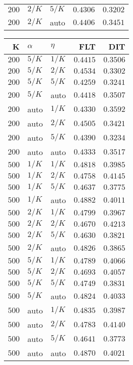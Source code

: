 \begin{table}
\begin{spacing}{1.2}
{\begin{tabular}{rll|rr}
$200$ &  $2/K$ &  $5/K$ &         $0.4306$ & $0.3202$ \\
$200$ &  $2/K$ &   auto &         $0.4406$ & $0.3451$ \\
\bottomrule
\end{tabular}
} \hfill \parbox{.45\linewidth}{\centering \begin{tabular}{rll|rr}
\toprule
    K &  $\alpha$ &    $\eta$ & FLT &        DIT \\
\midrule
$200$ &  $5/K$ &  $1/K$ &         $0.4415$ &      $0.3506$ \\
$200$ &  $5/K$ &  $2/K$ &         $0.4534$ &      $0.3302$ \\
$200$ &  $5/K$ &  $5/K$ &         $0.4259$ &      $0.3241$ \\
$200$ &  $5/K$ &   auto &         $0.4418$ &      $0.3507$ \\
$200$ &   auto &  $1/K$ &         $0.4330$ &      $0.3592$ \\
$200$ &   auto &  $2/K$ &         $0.4505$ &      $0.3421$ \\
$200$ &   auto &  $5/K$ &         $0.4390$ &      $0.3234$ \\
$200$ &   auto &   auto &         $0.4333$ &      $0.3517$ \\
\myrowcolor $500$ &  $1/K$ &  $1/K$ &         $0.4818$ &      $0.3985$ \\
$500$ &  $1/K$ &  $2/K$ &         $0.4758$ &      $0.4145$ \\
$500$ &  $1/K$ &  $5/K$ &         $0.4637$ &      $0.3775$ \\
$500$ &  $1/K$ &   auto &    $\bm{0.4882}$ &      $0.4011$ \\
$500$ &  $2/K$ &  $1/K$ &         $0.4799$ &      $0.3967$ \\
$500$ &  $2/K$ &  $2/K$ &         $0.4670$ & $\bm{0.4213}$ \\
$500$ &  $2/K$ &  $5/K$ &         $0.4630$ &      $0.3821$ \\
$500$ &  $2/K$ &   auto &         $0.4826$ &      $0.3865$ \\
$500$ &  $5/K$ &  $1/K$ &         $0.4789$ &      $0.4066$ \\
$500$ &  $5/K$ &  $2/K$ &         $0.4693$ &      $0.4057$ \\
$500$ &  $5/K$ &  $5/K$ &         $0.4749$ &      $0.3831$ \\
$500$ &  $5/K$ &   auto &         $0.4824$ &      $0.4033$ \\
$500$ &   auto &  $1/K$ &         $0.4835$ &      $0.3987$ \\
$500$ &   auto &  $2/K$ &         $0.4783$ &      $0.4140$ \\
$500$ &   auto &  $5/K$ &         $0.4641$ &      $0.3773$ \\
$500$ &   auto &   auto &         $0.4870$ &      $0.4021$ \\
\bottomrule
\end{tabular}
}
\end{spacing}
\end{table}
